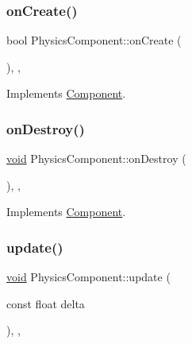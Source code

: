 \mbox{\label{classPhysicsComponent_ad797a2708cfc3c0e88a44341121f594d}} 
\subsubsection{\texorpdfstring{on\+Create()}{onCreate()}}
{\footnotesize\ttfamily bool Physics\+Component\+::on\+Create (\begin{DoxyParamCaption}{ }\end{DoxyParamCaption})\hspace{0.3cm}{\ttfamily [inline]}, {\ttfamily [override]}, {\ttfamily [virtual]}}



Implements \hyperlink{classComponent_a3a1537a8b8bcdb2155afbb925c77b0a2}{Component}.

\mbox{\label{classPhysicsComponent_a5a5e472f0c6975d4a22e0990c504ec0a}} 
\subsubsection{\texorpdfstring{on\+Destroy()}{onDestroy()}}
{\footnotesize\ttfamily \hyperlink{imgui__impl__opengl3__loader_8h_ac668e7cffd9e2e9cfee428b9b2f34fa7}{void} Physics\+Component\+::on\+Destroy (\begin{DoxyParamCaption}{ }\end{DoxyParamCaption})\hspace{0.3cm}{\ttfamily [inline]}, {\ttfamily [override]}, {\ttfamily [virtual]}}



Implements \hyperlink{classComponent_a2b198f27162a6caf63917e304295f892}{Component}.

\mbox{\label{classPhysicsComponent_a7494b2fec675132ee3e31050d7d87d30}} 
\subsubsection{\texorpdfstring{update()}{update()}}
{\footnotesize\ttfamily \hyperlink{imgui__impl__opengl3__loader_8h_ac668e7cffd9e2e9cfee428b9b2f34fa7}{void} Physics\+Component\+::update (\begin{DoxyParamCaption}\item[{const float}]{delta }\end{DoxyParamCaption})\hspace{0.3cm}{\ttfamily [inline]}, {\ttfamily [override]}, {\ttfamily [virtual]}}



